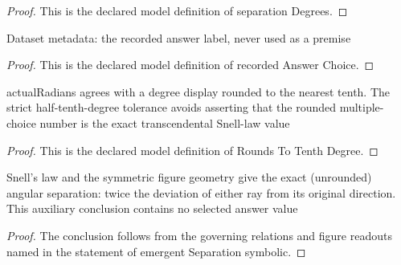 \begin{proof}
  This is the declared model definition of separation Degrees.
\end{proof}
\begin{definition}
  \label{def:physics:phyx-mini-0099:phyxminiproblems-problemphyxmini0099-recordedanswerchoice}
  Dataset metadata: the recorded answer label, never used as a premise
\end{definition}
\begin{proof}
  This is the declared model definition of recorded Answer Choice.
\end{proof}
\begin{definition}
  \label{def:physics:phyx-mini-0099:phyxminiproblems-problemphyxmini0099-roundstotenthdegree}
  actualRadians agrees with a degree display rounded to the nearest tenth. The strict half-tenth-degree tolerance avoids asserting that the rounded multiple-choice number is the exact transcendental Snell-law value
\end{definition}
\begin{proof}
  This is the declared model definition of Rounds To Tenth Degree.
\end{proof}
\begin{lemma}
  \label{lem:physics:phyx-mini-0099:phyxminiproblems-problemphyxmini0099-emergentseparation-symbolic}
  Snell's law and the symmetric figure geometry give the exact (unrounded) angular separation: twice the deviation of either ray from its original direction. This auxiliary conclusion contains no selected answer value
\end{lemma}
\begin{proof}
  The conclusion follows from the governing relations and figure readouts named in the statement of emergent Separation symbolic.
\end{proof}
